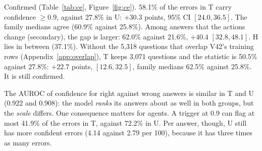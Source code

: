 \documentclass[11pt]{article}
\newcommand{\prereg}{\textsc{pre-registered}}
\begin{document}
\begin{table}[t]\centering\small
\caption{Confident errors on 15,008 generated questions (\prereg), for V42 and for the same model before consequence
training (Eikos-27B, the parent), on the same items through the same service at temperature 1. T: trained
families; H: trained families, held-out question types; U: families never trained. Table~\ref{tab:overlap} gives the
same table without the 5,318 questions that overlap V42's training rows.}
\label{tab:ce}
\end{table}

Confirmed (Table~\ref{tab:ce}, Figure~\ref{fig:ce}). 58.1\% of the errors in T carry confidence $\ge 0.9$, against
27.8\% in U: $+30.3$ points, 95\% CI $[24.0, 36.5]$. The family medians agree (60.9\% against 25.8\%). Among answers that
the actions change (secondary), the gap is larger: 62.0\% against 21.6\%, $+40.4$ $[32.8, 48.1]$. H lies in between
(37.1\%). Without the 5,318 questions that overlap V42's training rows (Appendix~\ref{app:overlap}), T keeps 3,071
questions and the statistic is 50.5\% against 27.8\%: $+22.7$ points, $[12.6, 32.5]$, family medians 62.5\% against
25.8\%. It is still confirmed.

The AUROC of confidence for right against wrong answers is similar in T and U (0.922 and 0.908): the model \emph{ranks}
its answers about as well in both groups, but the \emph{scale} differs. One consequence matters for agents. A trigger at
0.9 can flag at most 41.9\% of the errors in T, against 72.2\% in U. Per answer, though, U still has more confident
errors (4.14 against 2.79 per 100), because it has three times as many errors.
\end{document}
